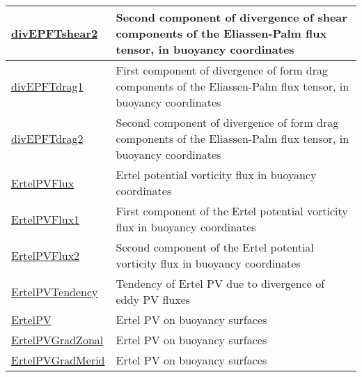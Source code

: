 {\begin{center}
\begin{longtable}{| p{2.0in} | p{4.0in} |}
    \hline
    \hyperref[subsec:var_sec_eliassenPalmAM_divEPFTshear2]{divEPFTshear2} & Second component of divergence of shear components of the Eliassen-Palm flux tensor, in buoyancy coordinates \\
    \hline
    \hyperref[subsec:var_sec_eliassenPalmAM_divEPFTdrag1]{divEPFTdrag1} & First component of divergence of form drag components of the Eliassen-Palm flux tensor, in buoyancy coordinates \\
    \hline
    \hyperref[subsec:var_sec_eliassenPalmAM_divEPFTdrag2]{divEPFTdrag2} & Second component of divergence of form drag components of the Eliassen-Palm flux tensor, in buoyancy coordinates \\
    \hline
    \hyperref[subsec:var_sec_eliassenPalmAM_ErtelPVFlux]{ErtelPVFlux} & Ertel potential vorticity flux in buoyancy coordinates \\
    \hline
    \hyperref[subsec:var_sec_eliassenPalmAM_ErtelPVFlux1]{ErtelPVFlux1} & First component of the Ertel potential vorticity flux in buoyancy coordinates \\
    \hline
    \hyperref[subsec:var_sec_eliassenPalmAM_ErtelPVFlux2]{ErtelPVFlux2} & Second component of the Ertel potential vorticity flux in buoyancy coordinates \\
    \hline
    \hyperref[subsec:var_sec_eliassenPalmAM_ErtelPVTendency]{ErtelPVTendency} & Tendency of Ertel PV due to divergence of eddy PV fluxes \\
    \hline
    \hyperref[subsec:var_sec_eliassenPalmAM_ErtelPV]{ErtelPV} & Ertel PV on buoyancy surfaces \\
    \hline
    \hyperref[subsec:var_sec_eliassenPalmAM_ErtelPVGradZonal]{ErtelPVGradZonal} & Ertel PV on buoyancy surfaces \\
    \hline
    \hyperref[subsec:var_sec_eliassenPalmAM_ErtelPVGradMerid]{ErtelPVGradMerid} & Ertel PV on buoyancy surfaces \\
    \hline
\end{longtable}
\end{center}
}
